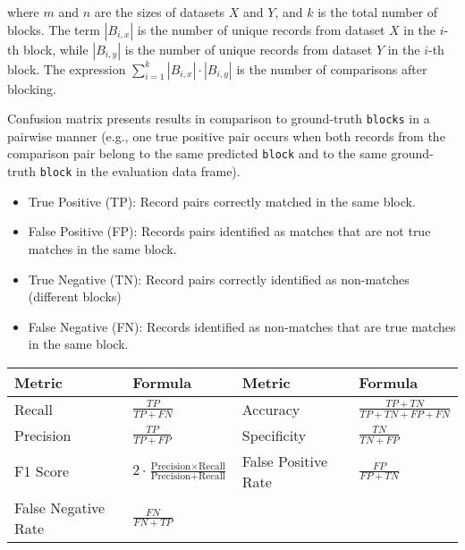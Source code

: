 where \(m\) and \(n\) are the sizes of datasets \(X\) and \(Y\), and \(k\) is the
total number of blocks. The term \(|B_{i,x}|\) is the number of unique
records from dataset \(X\) in the \(i\)-th block, while \(|B_{i,y}|\) is the
number of unique records from dataset \(Y\) in the \(i\)-th block. The
expression \(\sum\limits_{i=1}^{k} |B_{i,x}| \cdot |B_{i,y}|\) is the
number of comparisons after blocking.

Confusion matrix presents results in comparison to ground-truth
\texttt{blocks} in a pairwise manner (e.g., one true positive pair
occurs when both records from the comparison pair belong to the same
predicted \texttt{block} and to the same ground-truth \texttt{block} in
the evaluation data frame).

\begin{itemize}
\tightlist
\item
  True Positive (TP): Record pairs correctly matched in the same
  block.
\item
  False Positive (FP): Records pairs identified as matches that are
  not true matches in the same block.
\item
  True Negative (TN): Record pairs correctly identified as non-matches
  (different blocks)
\item
  False Negative (FN): Records identified as non-matches that are true
  matches in the same block.
\end{itemize}

\begin{longtable}[]{@{}
  >{\raggedright\arraybackslash}p{}
  >{\raggedright\arraybackslash}p{}
  >{\raggedright\arraybackslash}p{}
  >{\raggedright\arraybackslash}p{}@{}}
\toprule\noalign{}
\begin{minipage}[b]{\linewidth}\raggedright
\textbf{Metric}
\end{minipage} & \begin{minipage}[b]{\linewidth}\raggedright
\textbf{Formula}
\end{minipage} & \begin{minipage}[b]{\linewidth}\raggedright
\textbf{Metric}
\end{minipage} & \begin{minipage}[b]{\linewidth}\raggedright
\textbf{Formula}
\end{minipage} \\
\midrule\noalign{}
\endhead
\bottomrule\noalign{}
\endlastfoot
Recall & \(\frac{TP}{TP + FN}\) & Accuracy & \(\frac{TP + TN}{TP + TN + FP + FN}\) \\
Precision & \(\frac{TP}{TP + FP}\) & Specificity & \(\frac{TN}{TN + FP}\) \\
F1 Score & \(2 \cdot \frac{\text{Precision} \times \text{Recall}}{\text{Precision} + \text{Recall}}\) & False Positive Rate & \(\frac{FP}{FP + TN}\) \\
False Negative Rate & \(\frac{FN}{FN + TP}\) & & \\
\end{longtable}

